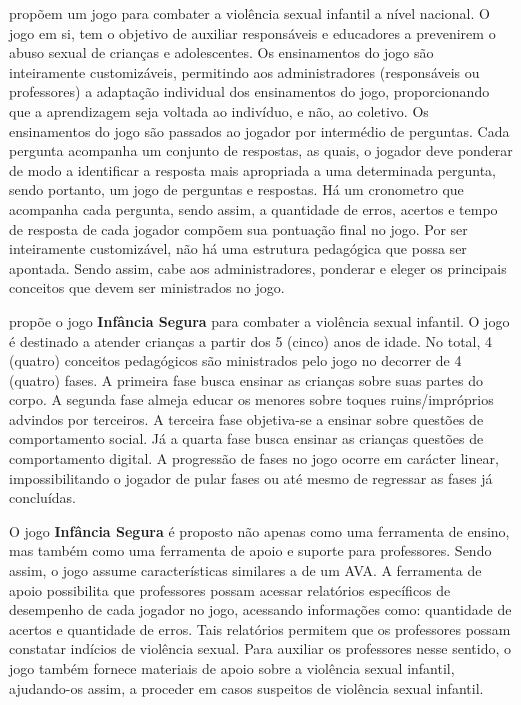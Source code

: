 propõem um jogo para combater a violência sexual infantil a nível nacional. O jogo em si, tem o objetivo de auxiliar responsáveis e educadores a prevenirem o abuso sexual de crianças e adolescentes. Os ensinamentos do jogo são inteiramente customizáveis, permitindo aos administradores (responsáveis ou professores) a adaptação individual dos ensinamentos do jogo, proporcionando que a aprendizagem seja voltada ao indivíduo, e não, ao coletivo. Os ensinamentos do jogo são passados ao jogador por intermédio de perguntas. Cada pergunta acompanha um conjunto de respostas, as quais, o jogador deve ponderar de modo a identificar a resposta mais apropriada a uma determinada pergunta, sendo portanto, um jogo de perguntas e respostas. Há um cronometro que acompanha cada pergunta, sendo assim, a quantidade de erros, acertos e tempo de resposta de cada jogador compõem sua pontuação final no jogo. Por ser inteiramente customizável, não há uma estrutura pedagógica que possa ser apontada. Sendo assim, cabe aos administradores, ponderar e eleger os principais conceitos que devem ser ministrados no jogo.

 propõe o jogo \textbf{Infância Segura} para combater a violência sexual infantil. O jogo é destinado a atender crianças a partir dos 5 (cinco) anos de idade. No total, 4 (quatro) conceitos pedagógicos são ministrados pelo jogo no decorrer de 4 (quatro) fases. A primeira fase busca ensinar as crianças sobre suas partes do corpo. A segunda fase almeja educar os menores sobre toques ruins/impróprios advindos por terceiros. A terceira fase objetiva-se a ensinar sobre questões de comportamento social. Já a quarta fase busca ensinar as crianças questões de comportamento digital. A progressão de fases no jogo ocorre em carácter linear, impossibilitando o jogador de pular fases ou até mesmo de regressar as fases já concluídas. 

O jogo \textbf{Infância Segura} é proposto não apenas como uma ferramenta de ensino, mas também como uma ferramenta de apoio e suporte para professores. Sendo assim, o jogo assume características similares a de um \ac{AVA}. A ferramenta de apoio possibilita que professores possam acessar relatórios específicos de desempenho de cada jogador no jogo, acessando informações como: quantidade de acertos e quantidade de erros. Tais relatórios permitem que os professores possam constatar indícios de violência sexual. Para auxiliar os professores nesse sentido, o jogo também fornece materiais de apoio sobre a violência sexual infantil, ajudando-os assim, a proceder em casos suspeitos de violência sexual infantil.

